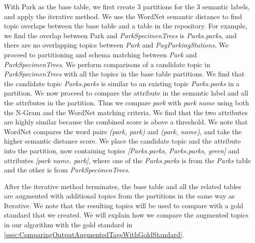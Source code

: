 With Park as the base table, we first create 3 partitions for the 3 semantic labels, and apply the iterative method. We use the WordNet semantic distance to find topic overlaps between the base table and a table in the repository. For example, we find the overlap between Park and \textit{ParkSpecimenTrees} is \textit{Parks.parks}, and there are no overlapping topics between \textit{Park} and \textit{PayParkingStations}. We proceed to partitioning and schema matching between \textit{Park} and \textit{ParkSpecimenTrees}. We perform comparisons of a candidate topic in \textit{ParkSpecimenTrees} with all the topics in the base table partitions. We find that the candidate topic \textit{Parks.parks} is similar to an existing topic \textit{Parks.parks} in a partition. We now proceed to compare the attribute in the semantic label and all the attributes in the partition. Thus we compare \textit{park} with \textit{park name} using both the N-Gram and the WordNet matching criteria. We find that the two attributes are highly similar because the combined score is above a threshold. We note that WordNet compares the word pairs \textit{(park, park)} and \textit{(park, name)}, and take the higher semantic distance score. We place the candidate topic and the attribute into the partition, now containing topics \textit{[Parks.parks, Parks.parks, green]} and attributes \textit{[park name, park]}, where one of the \textit{Parks.parks} is from the \textit{Parks} table and the other is from \textit{ParkSpecimenTrees}.

After the iterative method terminates, the base table and all the related tables are augmented with additional topics from the partitions in the same way as Iterative. We note that the resulting topics will be used to compare with a gold standard that we created. We will explain how we compare the augmented topics in our algorithm with the gold standard in \autoref{ssec:ComparingOutputAugmentedTagsWithGoldStandard}.
\endinput